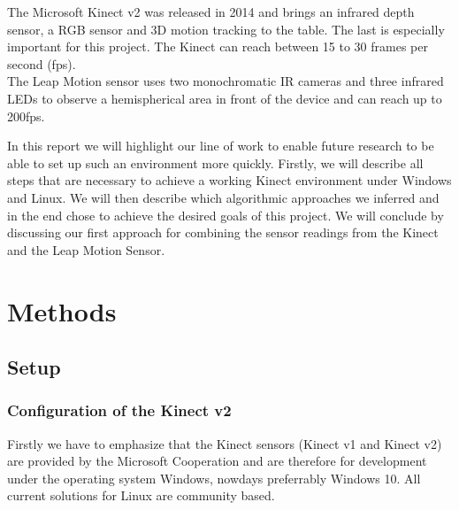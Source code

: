 \documentclass[11pt,a4paper,oldfontcommands, oneside]{memoir}
\begin{document}
The Microsoft Kinect v2 was released in 2014 and brings an infrared depth sensor, a RGB sensor and 3D motion tracking to the table. The last is especially important for this project. The Kinect can reach between 15 to 30 frames per second (fps).   \\
The Leap Motion sensor uses two monochromatic IR cameras and three infrared LEDs to observe a hemispherical area in front of the device and can reach up to 200fps.


In this report we will highlight our line of work to enable future research to be able to set up such an environment more quickly. 
Firstly, we will describe all steps that are necessary to achieve a working Kinect environment under Windows and Linux. We will then describe which algorithmic approaches we inferred and in the end chose to achieve the desired goals of this project. We will conclude by discussing our first approach for combining the sensor readings from the Kinect and the Leap Motion Sensor.


%
%


\chapter{Methods}

\section{Setup}

\subsection{Configuration of the Kinect v2}
Firstly we have to emphasize that the Kinect sensors (Kinect v1 and Kinect v2) are provided by the Microsoft Cooperation and are therefore for development under the operating system Windows, nowdays preferrably Windows 10. All current solutions for Linux are community based.
\end{document}
